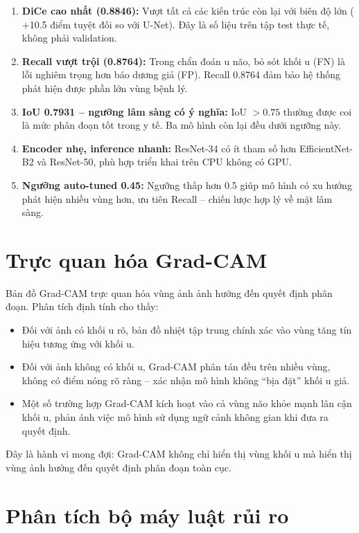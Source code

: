 \begin{sloppypar}
\begin{enumerate}
    \item \textbf{DiCe cao nhất (0.8846):} Vượt tất cả các kiến trúc còn lại với biên độ lớn ($+$10.5 điểm tuyệt đối so với U-Net). Đây là số liệu trên tập test thực tế, không phải validation.
    \item \textbf{Recall vượt trội (0.8764):} Trong chẩn đoán u não, bỏ sót khối u (FN) là lỗi nghiêm trọng hơn báo dương giả (FP). Recall 0.8764 đảm bảo hệ thống phát hiện được phần lớn vùng bệnh lý.
    \item \textbf{IoU 0.7931 -- ngưỡng lâm sàng có ý nghĩa:} IoU $> 0.75$ thường được coi là mức phân đoạn tốt trong y tế. Ba mô hình còn lại đều dưới ngưỡng này.
    \item \textbf{Encoder nhẹ, inference nhanh:} ResNet-34 có ít tham số hơn EfficientNet-B2 và ResNet-50, phù hợp triển khai trên CPU không có GPU.
    \item \textbf{Ngưỡng auto-tuned 0.45:} Ngưỡng thấp hơn 0.5 giúp mô hình có xu hướng phát hiện nhiều vùng hơn, ưu tiên Recall -- chiến lược hợp lý về mặt lâm sàng.
\end{enumerate}
\end{sloppypar}

\section{Trực quan hóa Grad-CAM}

Bản đồ Grad-CAM trực quan hóa vùng ảnh ảnh hưởng đến quyết định phân đoạn. Phân tích định tính cho thấy:

\begin{itemize}
    \item Đối với ảnh có khối u rõ, bản đồ nhiệt tập trung chính xác vào vùng tăng tín hiệu tương ứng với khối u.
    \item Đối với ảnh không có khối u, Grad-CAM phân tán đều trên nhiều vùng, không có điểm nóng rõ ràng -- xác nhận mô hình không ``bịa đặt'' khối u giả.
    \item Một số trường hợp Grad-CAM kích hoạt vào cả vùng não khỏe mạnh lân cận khối u, phản ánh việc mô hình sử dụng ngữ cảnh không gian khi đưa ra quyết định.
\end{itemize}

Đây là hành vi mong đợi: Grad-CAM không chỉ hiển thị vùng khối u mà hiển thị vùng ảnh hưởng đến quyết định phân đoạn toàn cục.

\section{Phân tích bộ máy luật rủi ro}

